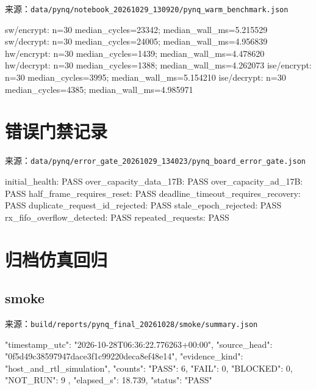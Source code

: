 来源：\texttt{data/\allowbreak{}pynq/\allowbreak{}notebook\_\allowbreak{}20261029\_\allowbreak{}130920/\allowbreak{}pynq\_\allowbreak{}warm\_\allowbreak{}benchmark.\allowbreak{}json}

\begin{codeblock}[samepage=true]
sw/encrypt: n=30 median_cycles=23342; median_wall_ms=5.215529
sw/decrypt: n=30 median_cycles=24005; median_wall_ms=4.956839
hw/encrypt: n=30 median_cycles=1439; median_wall_ms=4.478620
hw/decrypt: n=30 median_cycles=1388; median_wall_ms=4.262073
ise/encrypt: n=30 median_cycles=3995; median_wall_ms=5.154210
ise/decrypt: n=30 median_cycles=4385; median_wall_ms=4.985971
\end{codeblock}

\Needspace{177pt}

\section{错误门禁记录}

来源：\texttt{data/\allowbreak{}pynq/\allowbreak{}error\_\allowbreak{}gate\_\allowbreak{}20261029\_\allowbreak{}134023/\allowbreak{}pynq\_\allowbreak{}board\_\allowbreak{}error\_\allowbreak{}gate.\allowbreak{}json}

\begin{codeblock}[samepage=true]
initial_health: PASS
over_capacity_data_17B: PASS
over_capacity_ad_17B: PASS
half_frame_requires_reset: PASS
deadline_timeout_requires_recovery: PASS
duplicate_request_id_rejected: PASS
stale_epoch_rejected: PASS
rx_fifo_overflow_detected: PASS
repeated_requests: PASS
\end{codeblock}

\Needspace{85pt}

\section{归档仿真回归}

\Needspace{215pt}

\subsection{smoke}\label{smoke}

来源：\texttt{build/\allowbreak{}reports/\allowbreak{}pynq\_\allowbreak{}final\_\allowbreak{}20261028/\allowbreak{}smoke/\allowbreak{}summary.\allowbreak{}json}

\begin{codeblock}[samepage=true]
{
  "timestamp_utc": "2026-10-28T06:36:22.776263+00:00",
  "source_head": "0f5d49c38597947dace3f1c99220deca8ef48e14",
  "evidence_kind": "host_and_rtl_simulation",
  "counts": {
    "PASS": 6,
    "FAIL": 0,
    "BLOCKED": 0,
    "NOT_RUN": 9
  },
  "elapsed_s": 18.739,
  "status": "PASS"
}
\end{codeblock}

